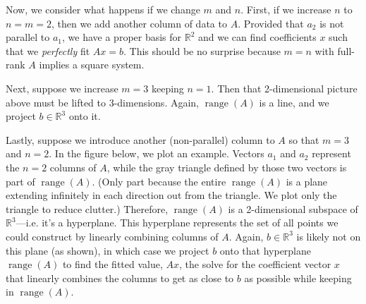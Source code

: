 \documentclass[12pt]{book}
\numberwithin{equation}{section} %
\theoremstyle{plain}
\theoremstyle{definition}
\theoremstyle{remark}
\newcommand{\R}{\mathbb{R}}
\newcommand{\range}{\operatorname{range}}
\begin{document}
\clearpage
Now, we consider what happens if we change $m$ and $n$. First, if we
increase $n$ to $n=m=2$, then we add another column of data to $A$.
Provided that $a_2$ is not parallel to $a_1$, we have a proper basis for
$\R^2$ and we can find coefficients $x$ such that we \emph{perfectly}
fit $Ax=b$. This should be no surprise because $m=n$ with full-rank $A$
implies a square system.

Next, suppose we increase $m=3$ keeping $n=1$. Then that 2-dimensional
picture above must be lifted to 3-dimensions. Again, $\range(A)$ is a
line, and we project $b\in\R^3$ onto it.

Lastly, suppose we introduce another (non-parallel) column to $A$ so
that $m=3$ and $n=2$. In the figure below, we plot an example.
Vectors $a_1$ and $a_2$ represent the $n=2$ columns of $A$, while the
gray triangle defined by those two vectors is part of $\range(A)$.
(Only part because the entire $\range(A)$ is a plane extending
infinitely in each direction out from the triangle. We plot only the
triangle to reduce clutter.)
Therefore, $\range(A)$ is a 2-dimensional subspace of $\R^3$---i.e. it's
a hyperplane. This hyperplane represents the set of all points we could
construct by linearly combining columns of $A$.  Again, $b\in\R^3$ is
likely not on this plane (as shown), in which case we project $b$ onto
that hyperplane $\range(A)$ to find the fitted value, $Ax$, the solve
for the coefficient vector $x$ that linearly combines the columns to get
as close to $b$ as possible while keeping in $\range(A)$.
\end{document}
